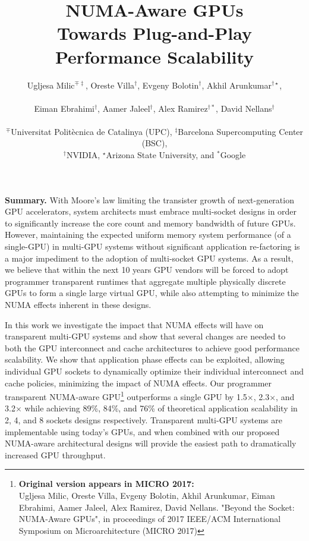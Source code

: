 \documentclass{sig-alternate}
\title{NUMA-Aware GPUs\\Towards Plug-and-Play Performance Scalability}
\author{
Ugljesa Milic$^{\mp\ddagger}$,
Oreste Villa$^{\dagger}$,
Evgeny Bolotin$^{\dagger}$,
Akhil Arunkumar$^{\dagger\star}$,\\\\
Eiman Ebrahimi$^{\dagger}$,
Aamer Jaleel$^{\dagger}$,
Alex Ramirez$^{\dagger\ast}$,
David Nellans$^{\dagger}$
\\\\
$^{\mp}$Universitat Polit\`ecnica de Catalinya (UPC), $^{\ddagger}$Barcelona Supercomputing Center (BSC), \\
$^{\dagger}$NVIDIA, $^{\star}$Arizona State University, and $^{\ast}$Google\\
}
\begin{document}
\maketitle
\pagestyle{plain}

\textbf{Summary.} With Moore's law limiting the transister growth of 
next-generation GPU accelerators, system architects must
embrace multi-socket designs in order to significantly increase the core count and memory 
bandwidth of future GPUs. However, maintaining the expected uniform memory 
system performance (of a single-GPU) in multi-GPU systems without significant 
application re-factoring is a major impediment to the adoption of multi-socket GPU
systems. As a result, we believe that within the next 10 
years GPU vendors will be forced to adopt programmer transparent runtimes that 
aggregate multiple physically discrete GPUs to form a single large virtual 
GPU, while also attempting to minimize the NUMA effects inherent in these designs.

In this work we investigate the impact that NUMA effects will have on 
transparent multi-GPU systems and show that several changes are needed to 
both the GPU interconnect and cache architectures to achieve good performance 
scalability. We show that application phase effects can be exploited, allowing 
individual GPU sockets to dynamically optimize their individual interconnect and cache 
policies, minimizing the impact of NUMA effects. Our programmer transparent NUMA-aware 
GPU\footnote{\textbf{Original version appears in MICRO 2017:} \\ Ugljesa Milic, 
Oreste Villa, Evgeny Bolotin, Akhil Arunkumar, Eiman Ebrahimi, Aamer Jaleel, 
Alex Ramirez, David Nellans. "Beyond the Socket: NUMA-Aware GPUs", in 
proceedings of 2017 IEEE/ACM International Symposium on Microarchitecture (MICRO 
2017)} outperforms a single GPU by 1.5$\times$, 2.3$\times$, and 3.2$\times$ 
while achieving 89\%, 84\%, and 76\% of theoretical application scalability in 
2, 4, and 8 sockets designs respectively. Transparent multi-GPU systems are 
implementable using today's GPUs, and when combined with our proposed 
NUMA-aware architectural designs will provide the easiest path to 
dramatically increased GPU throughput.
\end{document}
